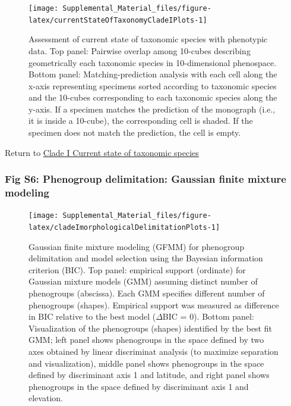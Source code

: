 \documentclass[
  11pt,
]{article}
\begin{document}
\begin{figure}
\texttt{[image: Supplemental\_Material\_files/figure-latex/currentStateOfTaxonomyCladeIPlots-1]} \caption{Assessment of current state of taxonomic species with phenotypic data. Top panel: Pairwise overlap among 10-cubes describing geometrically each taxonomic species in 10-dimensional phenospace. Bottom panel: Matching-prediction analysis with each cell along the x-axis representing specimens sorted according to taxonomic species and the 10-cubes corresponding to each taxonomic species along the y-axis. If a specimen matches the prediction of the monograph (i.e., it is inside a 10-cube), the corresponding cell is shaded. If the specimen does not match the prediction, the cell is empty.}\label{fig:currentStateOfTaxonomyCladeIPlots}
\end{figure}

Return to \protect\hyperlink{current-state-of-taxonomic-species}{Clade I Current state of taxonomic species}
\pagebreak

\hypertarget{fig-s6-phenogroup-delimitation-gaussian-finite-mixture-modeling}{%
\subsubsection{Fig S6: Phenogroup delimitation: Gaussian finite mixture modeling}\label{fig-s6-phenogroup-delimitation-gaussian-finite-mixture-modeling}}

\begin{figure}
\texttt{[image: Supplemental\_Material\_files/figure-latex/cladeImorphologicalDelimitationPlots-1]} \caption{Gaussian finite mixture modeling (GFMM) for phenogroup delimitation and model selection using the Bayesian information criterion (BIC). Top panel: empirical support (ordinate) for Gaussian mixture models (GMM) assuming distinct number of phenogroups (abscissa). Each GMM specifies different number of phenogroups (shapes). Empirical support was measured as difference in BIC relative to the best model ($\Delta$BIC = $0$). Bottom panel: Visualization of the phenogroups (shapes) identified by the best fit GMM; left panel shows phenogroups in the space defined by two axes obtained by linear discriminat analysis (to maximize separation and visualization), middle panel shows phenogroups in the space defined by discriminant axis 1 and latitude, and right panel shows phenogroups in the space defined by discriminant axis 1 and elevation.}\label{fig:cladeImorphologicalDelimitationPlots}
\end{figure}
\end{document}
